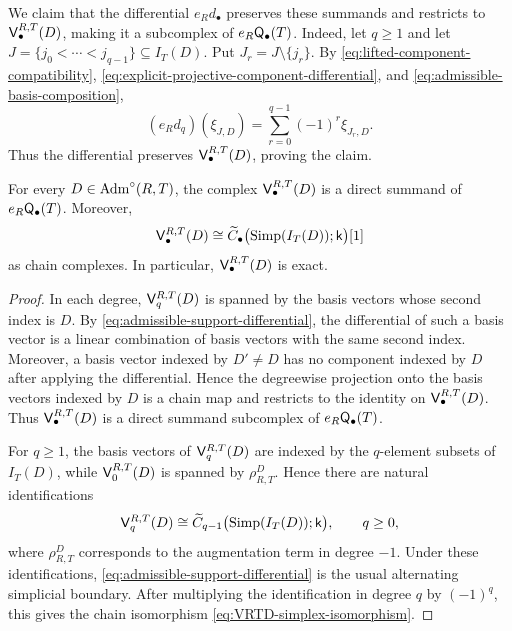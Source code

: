 We claim that the differential $e_Rd_\bullet$ preserves these
summands and restricts to
$\mathsf V_\bullet^{R,T}(D)$, making it a subcomplex of
$e_R\mathsf Q_\bullet(T)$. 
Indeed, let $q\geq1$ and let
$J=\{j_0<\cdots<j_{q-1}\}\subseteq I_T(D)$.  Put
$J_r=J\setminus\{j_r\}$.  By
\eqref{eq:lifted-component-compatibility},
\eqref{eq:explicit-projective-component-differential}, and
\eqref{eq:admissible-basis-composition},
\begin{equation}
\label{eq:admissible-support-differential}
(e_Rd_q)(\xi_{J,D})
=
\sum_{r=0}^{q-1}(-1)^r\xi_{J_r,D}.
\end{equation}
Thus the differential preserves
$\mathsf V_\bullet^{R,T}(D)$, proving the claim.


\begin{lemma}
\label{lem:admissible-support-simplex-complex}
For every $D\in\operatorname{Adm}^\circ(R,T)$, the complex
$\mathsf V_\bullet^{R,T}(D)$ is a direct summand of
$e_R\mathsf Q_\bullet(T)$.
Moreover,
\begin{equation}
\mathsf V_\bullet^{R,T}(D)
\cong
\widetilde C_\bullet
\bigl(\operatorname{Simp}(I_T(D));\mathsf{k}\bigr)[1]
\label{eq:VRTD-simplex-isomorphism}
\end{equation}
as chain complexes. 
In particular, $\mathsf V_\bullet^{R,T}(D)$ is exact.
\end{lemma}

\begin{proof}
In each degree, $\mathsf V_{q}^{R,T}(D)$ is spanned by the basis vectors
whose second index is $D$.  By
\eqref{eq:admissible-support-differential}, the differential of such
a basis vector is a linear combination of basis vectors with the same
second index.  Moreover, a basis vector indexed by $D'\neq D$ has no
component indexed by $D$ after applying the differential.  Hence the
degreewise projection onto the basis vectors indexed by $D$ is a
chain map and restricts to the identity on
$\mathsf V_{\bullet}^{R,T}(D)$.  Thus $\mathsf V_{\bullet}^{R,T}(D)$ is a direct summand
subcomplex of $e_R\mathsf Q_\bullet(T)$.

For $q\geq1$, the basis vectors of $\mathsf V_q^{R,T}(D)$ are indexed by the
$q$-element subsets of $I_T(D)$, while $\mathsf V_0^{R,T}(D)$ is spanned by
$\rho_{R,T}^{D}$.  Hence there are natural identifications
\[
\mathsf V_q^{R,T}(D)
\cong
\widetilde C_{q-1}\bigl(\operatorname{Simp}(I_T(D));\mathsf{k}\bigr),
\qquad q\geq0,
\]
where $\rho_{R,T}^{D}$ corresponds to the augmentation term in degree
$-1$.  
Under these identifications,
\eqref{eq:admissible-support-differential} is the usual alternating
simplicial boundary. After multiplying the identification in degree
$q$ by $(-1)^q$, this gives the chain isomorphism
\eqref{eq:VRTD-simplex-isomorphism}.
\end{proof}

